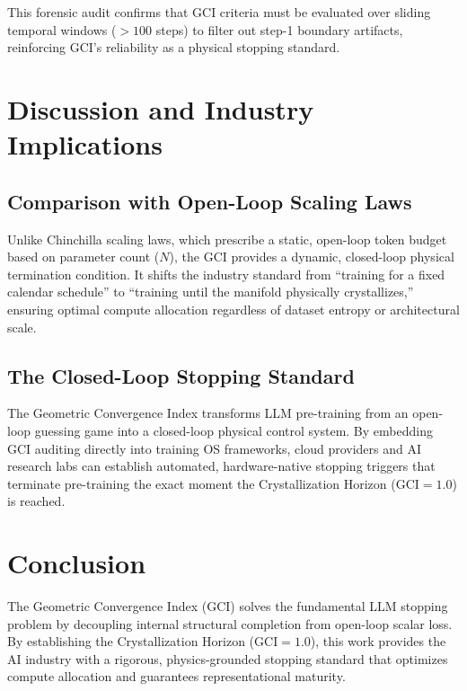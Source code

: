 \documentclass[11pt,twocolumn]{article}
\begin{document}
This forensic audit confirms that GCI criteria must be evaluated over sliding temporal windows ($>100$ steps) to filter out step-1 boundary artifacts, reinforcing GCI's reliability as a physical stopping standard.

\section{Discussion and Industry Implications}

\subsection{Comparison with Open-Loop Scaling Laws}
Unlike Chinchilla scaling laws, which prescribe a static, open-loop token budget based on parameter count ($N$), the GCI provides a dynamic, closed-loop physical termination condition. It shifts the industry standard from ``training for a fixed calendar schedule'' to ``training until the manifold physically crystallizes,'' ensuring optimal compute allocation regardless of dataset entropy or architectural scale.

\subsection{The Closed-Loop Stopping Standard}
The Geometric Convergence Index transforms LLM pre-training from an open-loop guessing game into a closed-loop physical control system. By embedding GCI auditing directly into training OS frameworks, cloud providers and AI research labs can establish automated, hardware-native stopping triggers that terminate pre-training the exact moment the Crystallization Horizon ($\text{GCI} = 1.0$) is reached.

\section{Conclusion}
The Geometric Convergence Index (GCI) solves the fundamental LLM stopping problem by decoupling internal structural completion from open-loop scalar loss. By establishing the Crystallization Horizon ($\text{GCI} = 1.0$), this work provides the AI industry with a rigorous, physics-grounded stopping standard that optimizes compute allocation and guarantees representational maturity.
\end{document}
